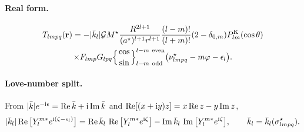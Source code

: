 \paragraph{Real form.}
\begin{multline}
  T_{lmpq}(\vr)=-|\kb_l|\G M^\star\frac{R^{2l+1}}{(a^\star)^{l+1}r^{l+1}}\frac{(l-m)!}{(l+m)!}(2-\delta_{0,m})\PK_{lm}(\cos\theta)\\
  \times F_{lmp}G_{lpq}\Big\{{\cos\atop\sin}\Big\}^{l-m\ \text{even}}_{l-m\ \text{odd}}\big(\nu^\star_{lmpq}-m\varphi-\epsilon_l\big). \label{eq:T-real}
\end{multline}

\paragraph{Love-number split.} From $|\bar k|e^{-\mathrm{i}\epsilon}=\operatorname{Re}\bar k+\mathrm{i}\operatorname{Im}\bar k$ and $\operatorname{Re}[(x+\mathrm{i} y)z]=x\operatorname{Re} z-y\operatorname{Im} z$,
\begin{equation}
  |\bar k_l|\operatorname{Re}\big[Y_l^{m*}e^{\mathrm{i}(\zeta-\epsilon_l)}\big]=\operatorname{Re}\bar k_l\,\operatorname{Re}\big[Y_l^{m*}e^{\mathrm{i}\zeta}\big]-\operatorname{Im}\bar k_l\,\operatorname{Im}\big[Y_l^{m*}e^{\mathrm{i}\zeta}\big],\qquad \bar k_l=\bar k_l(\sigma^\star_{lmpq}). \label{eq:love-split}
\end{equation}
